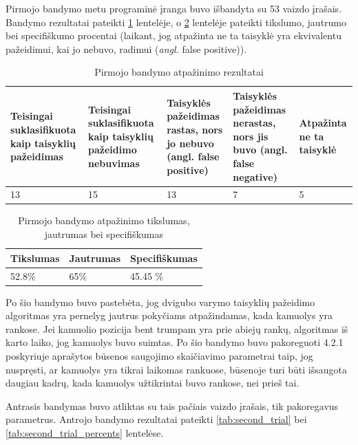 \documentclass{VUMIFPSbakalaurinis}
\begin{document}
Pirmojo bandymo metu programinė įranga buvo išbandyta su 53 vaizdo įrašais. Bandymo rezultatai pateikti \ref{tab:first_trial} lentelėje, o \ref{tab:first_trial_percents} lentelėje pateikti tikslumo, jautrumo bei specifiškumo procentai (laikant, jog atpažinta ne ta taisyklė yra ekvivalentu pažeidimui, kai jo nebuvo, radimui (\textit{angl.} false positive)). 

 \begin{table}[H]\footnotesize
 	\centering
 	\caption{Pirmojo bandymo atpažinimo rezultatai}
 	{\begin{tabular}{|p{3cm}|p{3cm}|p{3cm}|p{3cm}|p{2cm}|} \hline
 			\textbf{Teisingai suklasifikuota kaip taisyklių pažeidimas} & \textbf{Teisingai suklasifikuota kaip taisyklių pažeidimo nebuvimas} & \textbf{Taisyklės pažeidimas rastas, nors jo nebuvo (angl. false positive)} & \textbf{Taisyklės pažeidimas nerastas, nors jis buvo (angl. false negative)} & \textbf{Atpažinta ne ta taisyklė} \\
 			\hline
 			13  & 15    & 13    & 7    & 5   \\

 			\hline
 	\end{tabular}}
 	\label{tab:first_trial}
 \end{table}

 \begin{table}[H]\footnotesize
	\centering
	\caption{Pirmojo bandymo atpažinimo tikslumas, jautrumas bei specifiškumas}
	{\begin{tabular}{|p{5cm}|p{5cm}|p{5cm}|} \hline
			\textbf{Tikslumas} & \textbf{Jautrumas} & \textbf{Specifiškumas} \\
			\hline
			52.8\%  & 65\%    & 45.45 \%    \\
			
			\hline
	\end{tabular}}
	\label{tab:first_trial_percents}
\end{table}

Po šio bandymo buvo pastebėta, jog dvigubo varymo taisyklių pažeidimo algoritmas yra pernelyg jautrus pokyčiams atpažindamas, kada kamuolys yra rankose. Jei kamuolio pozicija bent trumpam yra prie abiejų rankų, algoritmas iš karto laiko, jog kamuolys buvo suimtas. Po šio bandymo buvo pakoreguoti 4.2.1 poskyriuje aprašytos būsenos saugojimo skaičiavimo parametrai taip, jog nuspręsti, ar kamuolys yra tikrai laikomas rankuose, būsenoje turi būti išsaugota daugiau kadrų, kada kamuolys užtikrintai buvo rankose, nei prieš tai.

Antrasis bandymas buvo atliktas su tais pačiais vaizdo įrašais, tik pakoregavus parametrus. Antrojo bandymo rezultatai pateikti  \ref{tab:second_trial} bei \ref{tab:second_trial_percents} lentelėse.
\end{document}
